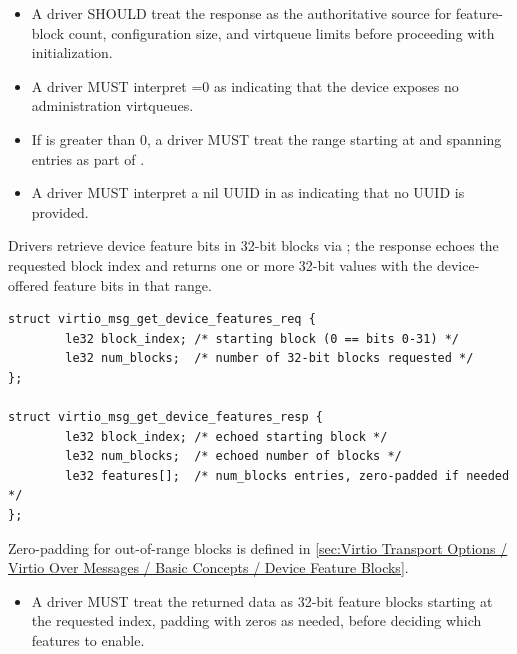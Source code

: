 \begin{itemize}
  \item A driver SHOULD treat the response as the authoritative source for
        feature-block count, configuration size, and virtqueue limits before
        proceeding with initialization.
  \item A driver MUST interpret =0 as indicating that the
        device exposes no administration virtqueues.
  \item If  is greater than 0, a driver MUST treat the
        range starting at  and spanning
         entries as part of .
  \item A driver MUST interpret a nil UUID in  as indicating
        that no UUID is provided.
\end{itemize}


Drivers retrieve device feature bits in 32-bit blocks via
; the response echoes the requested block index and
returns one or more 32-bit values with the device-offered feature bits in that
range.

\begin{lstlisting}
struct virtio_msg_get_device_features_req {
        le32 block_index; /* starting block (0 == bits 0-31) */
        le32 num_blocks;  /* number of 32-bit blocks requested */
};

struct virtio_msg_get_device_features_resp {
        le32 block_index; /* echoed starting block */
        le32 num_blocks;  /* echoed number of blocks */
        le32 features[];  /* num_blocks entries, zero-padded if needed */
};
\end{lstlisting}

Zero-padding for out-of-range blocks is defined in
\ref{sec:Virtio Transport Options / Virtio Over Messages / Basic Concepts / Device Feature Blocks}.

\begin{itemize}
  \item A driver MUST treat the returned data as 32-bit feature blocks starting
        at the requested index, padding with zeros as needed, before deciding
        which features to enable.
\end{itemize}


